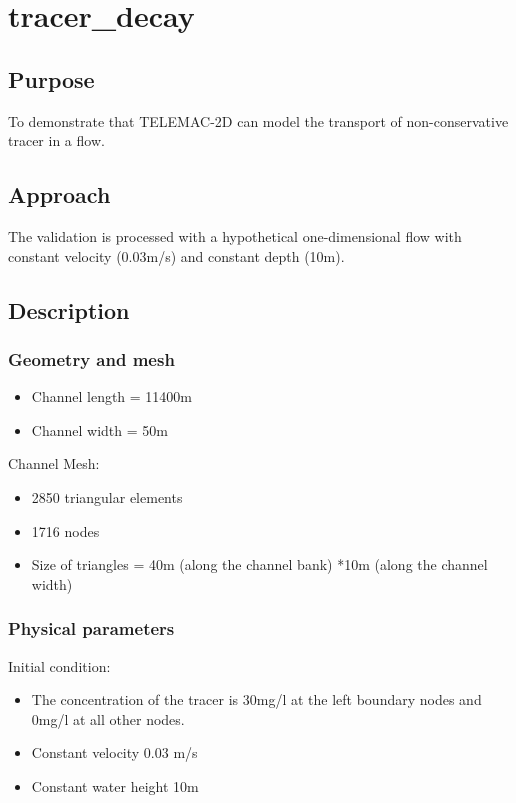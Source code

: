 \chapter{tracer\_decay}

\section{Purpose}

To demonstrate that TELEMAC-2D can model the transport of non-conservative
tracer in a flow.

\section{Approach}
The validation is processed with a hypothetical one-dimensional flow with
constant velocity (0.03m/s) and constant depth (10m).

\section{Description}

\subsection{Geometry and mesh}
\begin{itemize}
\item Channel length = 11400m
\item Channel width = 50m
\end{itemize}

Channel Mesh:
\begin{itemize}
\item 2850 triangular elements
\item 1716 nodes
\item Size of triangles = 40m (along the channel bank) *10m (along the channel width)
\end{itemize}

\subsection{Physical parameters}

Initial condition:
\begin{itemize}
  \item The concentration of the tracer is 30mg/l at the left boundary
nodes and 0mg/l at all other nodes.
\item Constant velocity 0.03 m/s
\item Constant water height 10m
\end{itemize}


